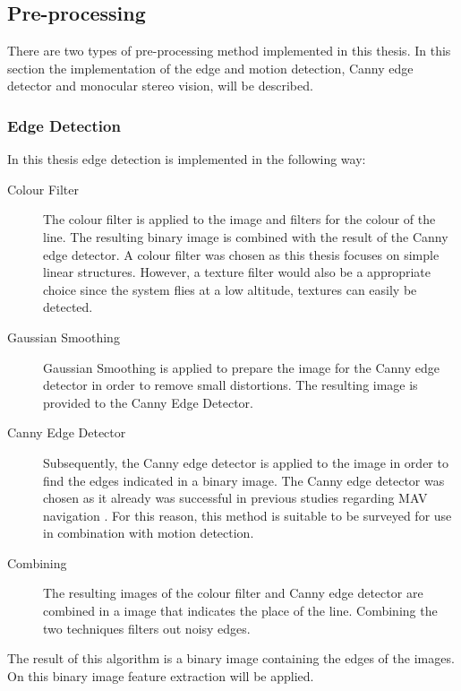 \documentclass[a4paper]{article}
\begin{document}
\subsection{Pre-processing}
There are two types of pre-processing method implemented in this thesis. In this section the implementation of the edge and motion detection, Canny edge detector and monocular stereo vision, will be described.

\subsubsection{Edge Detection}
In this thesis edge detection is implemented in the following way:
\begin{description}
\item[Colour Filter] The colour filter is applied to the image and filters for the colour of the line. The resulting binary image is combined with the result of the Canny edge detector. A colour filter was chosen as this thesis focuses on simple linear structures. However, a texture filter would also be a appropriate choice since the system flies at a low altitude, textures can easily be detected.
\item[Gaussian Smoothing] Gaussian Smoothing is applied to prepare the image for the Canny edge detector in order to remove small distortions. The resulting image is provided to the Canny Edge Detector.
\item[Canny Edge Detector] Subsequently, the Canny edge detector is applied to the image in order to find the edges indicated in a binary image. The Canny edge detector was chosen as it already was successful in previous studies regarding MAV navigation \cite{Bills2011}. For this reason, this method is suitable to be surveyed for use in combination with motion detection.
\item[Combining] The resulting images of the colour filter and Canny edge detector are combined in a image that indicates the place of the line. Combining the two techniques filters out noisy edges.
\end{description}
The result of this algorithm is a binary image containing the edges of the images. On this binary image feature extraction will be applied.
\end{document}

